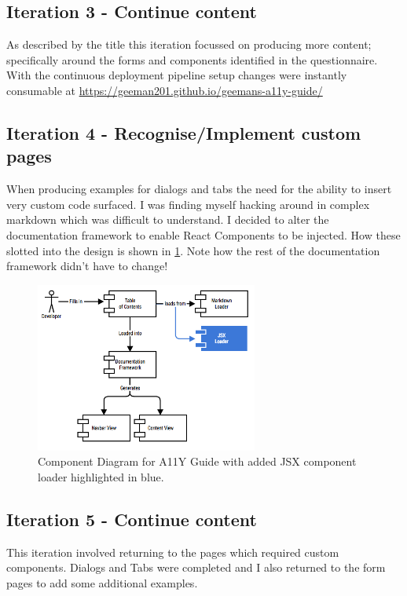\subsection{Iteration 3 - Continue content}
As described by the title this iteration focussed on producing more content;
specifically around the forms and components identified in the questionnaire.
With the continuous deployment pipeline setup changes were instantly
consumable at \url{https://geeman201.github.io/geemans-a11y-guide/}

\subsection{Iteration 4 - Recognise/Implement custom pages}
\label{sec:iteration_4}
When producing examples for dialogs and tabs the
need for the ability to insert very custom code surfaced. I was finding myself
hacking around in complex markdown which was difficult to understand. I decided
to alter the documentation framework to enable React Components to be injected.
How these slotted into the design is
shown in \ref{fig:allycomponent_2}. Note how the rest of the documentation
framework didn't have to change!

\begin{figure}[H]
\centering
\includegraphics[width=0.65\textwidth]{figures/documentation_design_2}
\captionsetup{justification=centering}
\caption{Component Diagram for A11Y Guide with added JSX
component loader highlighted in blue.
\label{fig:allycomponent_2}}
\end{figure}

\subsection{Iteration 5 - Continue content}
This iteration involved returning to the pages which required custom
components. Dialogs and Tabs were completed and I also returned to the form
pages to add some additional examples.

